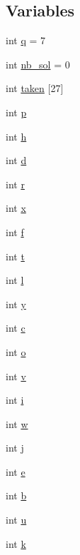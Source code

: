 \subsection*{Variables}
\begin{DoxyCompactItemize}
\item 
int \mbox{\hyperlink{alphabet2_8_c_a39ed6f33ae9187d166e4d9d69e456ff9}{q}} = 7
\item 
int \mbox{\hyperlink{alphabet2_8_c_a8059a1d2e4c33dbffdc8c7cd659a3e4d}{nb\+\_\+sol}} = 0
\item 
int \mbox{\hyperlink{alphabet2_8_c_a9aed94c6128317cc3c8c3c51c7b248c8}{taken}} \mbox{[}27\mbox{]}
\item 
int \mbox{\hyperlink{alphabet2_8_c_a533391314665d6bf1b5575e9a9cd8552}{p}}
\item 
int \mbox{\hyperlink{alphabet2_8_c_a16611451551e3d15916bae723c3f59f7}{h}}
\item 
int \mbox{\hyperlink{alphabet2_8_c_a6f364afbe132c4ecfea48bde1b0618ba}{d}}
\item 
int \mbox{\hyperlink{alphabet2_8_c_acab531abaa74a7e664e3986f2522b33a}{r}}
\item 
int \mbox{\hyperlink{alphabet2_8_c_a6150e0515f7202e2fb518f7206ed97dc}{x}}
\item 
int \mbox{\hyperlink{alphabet2_8_c_a362077c979b0bb65159c603270e40f70}{f}}
\item 
int \mbox{\hyperlink{alphabet2_8_c_ac310d9181e916ba43604099aee272c71}{t}}
\item 
int \mbox{\hyperlink{alphabet2_8_c_a89606eca6b563ec68d2da2e84657736f}{l}}
\item 
int \mbox{\hyperlink{alphabet2_8_c_a0a2f84ed7838f07779ae24c5a9086d33}{y}}
\item 
int \mbox{\hyperlink{alphabet2_8_c_a4e1e0e72dd773439e333c84dd762a9c3}{c}}
\item 
int \mbox{\hyperlink{alphabet2_8_c_a8198753dd743101d6583a27b1454fc4a}{o}}
\item 
int \mbox{\hyperlink{alphabet2_8_c_ac8859e8c1ce357c4c8b37bbb1936ba1c}{v}}
\item 
int \mbox{\hyperlink{alphabet2_8_c_acb559820d9ca11295b4500f179ef6392}{i}}
\item 
int \mbox{\hyperlink{alphabet2_8_c_aac374e320caaadeca4874add33b62af2}{w}}
\item 
int \mbox{\hyperlink{alphabet2_8_c_a37d972ae0b47b9099e30983131d31916}{j}}
\item 
int \mbox{\hyperlink{alphabet2_8_c_a88859ce72faebb79ea0a2bca00a0f46b}{e}}
\item 
int \mbox{\hyperlink{alphabet2_8_c_a148e3876077787926724625411d6e7a9}{b}}
\item 
int \mbox{\hyperlink{alphabet2_8_c_a5874b4c2ec2e28321eea4e4871d08222}{u}}
\item 
int \mbox{\hyperlink{alphabet2_8_c_ab66ed8e0098c0a86b458672a55a9cca9}{k}}
\end{DoxyCompactItemize}


